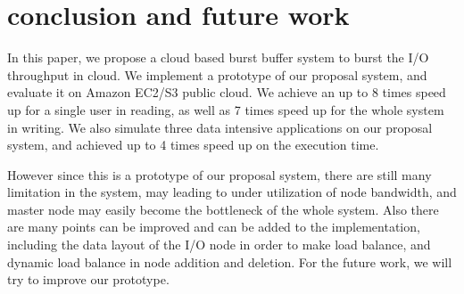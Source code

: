 \section{conclusion and future work}
\label{sec:conclusion}
In this paper, we propose a cloud based burst buffer system to burst the I/O throughput in cloud.
We implement a prototype of our proposal system, and evaluate it on Amazon EC2/S3 public cloud.
We achieve an up to 8 times speed up for a single user in reading, as well as 7 times speed
up for the whole system in writing.
We also simulate three data intensive applications on our proposal system, and achieved up to 4
times speed up on the execution time.

However since this is a prototype of our proposal system, there are still many limitation in the
system, may leading to under utilization of node bandwidth, and master node may easily become the
bottleneck of the whole system.
Also there are many points can be improved and can be added to the implementation, including the
data layout of the I/O node in order to make load balance, and dynamic load balance in node addition
and deletion.
For the future work, we will try to improve our prototype.
